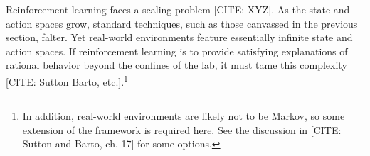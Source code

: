 Reinforcement learning faces a scaling problem [CITE: XYZ].
As the state and action spaces grow, standard techniques, such as those canvassed in the previous section, falter.
Yet real-world environments feature essentially infinite state and action spaces.
If reinforcement learning is to provide satisfying explanations of rational behavior beyond the confines of the lab, it must tame this complexity [CITE: Sutton Barto, etc.].\footnote{In addition, real-world environments are likely not to be Markov, so some extension of the framework is required here.
See the discussion in [CITE: Sutton and Barto, ch. 17] for some options.}


